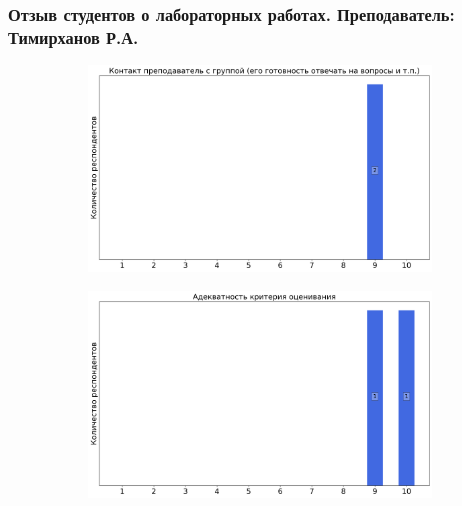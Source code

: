 	\subsubsection{Отзыв студентов о лабораторных работах. Преподаватель: Тимирханов Р.А.}
		\begin{figure}[H]
			\centering
			\begin{subfigure}[b]{0.45\textwidth}
				\centering
				\includegraphics[width=\textwidth]{images/2 course/Общая физика - электричество и магнетизм/labniks-marks-Тимирханов Р.А.-0.png}
			\end{subfigure}
			\begin{subfigure}[b]{0.45\textwidth}
				\centering
				\includegraphics[width=\textwidth]{images/2 course/Общая физика - электричество и магнетизм/labniks-marks-Тимирханов Р.А.-1.png}
			\end{subfigure}
			\begin{subfigure}[b]{0.45\textwidth}
				\centering

\end{subfigure}
\end{figure}
